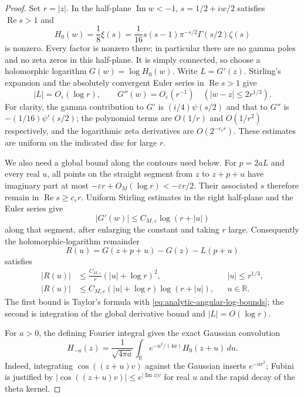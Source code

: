 \begin{proof}
Set $r=|z|$. In the half-plane $\operatorname{Im}w<-1$,
$s=1/2+iw/2$ satisfies $\operatorname{Re}s>1$ and
\[
 H_0(w)=\frac18\xi(s)
       =\frac1{16}s(s-1)\pi^{-s/2}\Gamma(s/2)\zeta(s)
\]
is nonzero. Every factor is nonzero there; in particular there are
no gamma poles and no zeta zeros in this half-plane. It is simply
connected, so choose a holomorphic logarithm $G(w)=\log H_0(w)$.
Write $L=G'(z)$. Stirling's expansion and the absolutely convergent
Euler series in $\operatorname{Re}s>1$ give
\begin{equation}\label{eq:analytic-angular-log-bounds}
 |L|=O_\varepsilon(\log r),\qquad
 G''(w)=O_\varepsilon(r^{-1})\quad
              (|w-z|\le 2r^{1/3}).
\end{equation}
For clarity, the gamma contribution to $G'$ is
$(i/4)\psi(s/2)$ and that to $G''$ is
$-(1/16)\psi'(s/2)$; the polynomial terms are $O(1/r)$ and
$O(1/r^2)$ respectively, and the logarithmic zeta derivatives
are $O(2^{-c_\varepsilon r})$. These estimates are uniform on
the indicated disc for large $r$.

We also need a global bound along the contours used below.
For $p=2aL$ and every real $u$, all points on the straight segment
from $z$ to $z+p+u$ have imaginary part at most
$-\varepsilon r+O_M(\log r)<-\varepsilon r/2$.
Their associated $s$ therefore remain in
$\operatorname{Re}s\ge c_\varepsilon r$. Uniform Stirling estimates
in the right half-plane and the Euler series give
\[
 |G'(w)|\le C_{M,\varepsilon}\log(r+|u|)
\]
along that segment, after enlarging the constant and taking $r$
large. Consequently the holomorphic-logarithm remainder
\[
 R(u)=G(z+p+u)-G(z)-L(p+u)
\]
satisfies
\begin{align}
 |R(u)|&\le
 \frac{C_{M,\varepsilon}}r(|u|+\log r)^2,
                  &&|u|\le r^{1/3},\label{eq:analytic-local-R}\\
 |R(u)|&\le C_{M,\varepsilon}
       (|u|+\log r)\log(r+|u|),
                  &&u\in\mathbb R.\label{eq:analytic-global-R}
\end{align}
The first bound is Taylor's formula with
\eqref{eq:analytic-angular-log-bounds}; the second is integration
of the global derivative bound and $|L|=O(\log r)$.

For $a>0$, the defining Fourier integral gives the exact Gaussian
convolution
\begin{equation}\label{eq:analytic-negative-heat-convolution}
 H_{-a}(z)=\frac1{\sqrt{4\pi a}}
       \int_{\mathbb R}e^{-u^2/(4a)}H_0(z+u)\,du.
\end{equation}
Indeed, integrating $\cos((z+u)v)$ against the Gaussian inserts
$e^{-av^2}$; Fubini is justified by
$|\cos((z+u)v)|\le e^{|\operatorname{Im}z|v}$ for real $u$
and the rapid decay of the theta kernel.


\end{proof}
